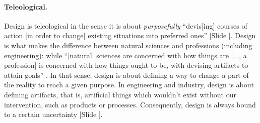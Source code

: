 \documentclass{article}
\newcounter{slide}
\begin{document}
\paragraph{Teleological.} Design is teleological in the sense it is about \emph{purposefully} ``devis[ing] courses of action [in order to change] existing situations into preferred ones'' {\color{blue}[Slide ]}\cite[p. 111]{simon1996sciences}. Design is what makes the difference between natural sciences and professions (including engineering): while ``[natural] sciences are concerned with how things are [..., a profession] is concerned with how things ought to be, with devising artifacts to attain goals'' \cite[p. 114]{simon1996sciences}. In that sense, design is about defining a way to change a part of the reality to reach a given purpose. In engineering and industry, design is about defining artifacts, that is, artificial things which wouldn't exist without our intervention, such as products or processes. {\color{red}Consequently, design is always bound to a certain uncertainty {\color{blue}[Slide ]}.}
\end{document}
